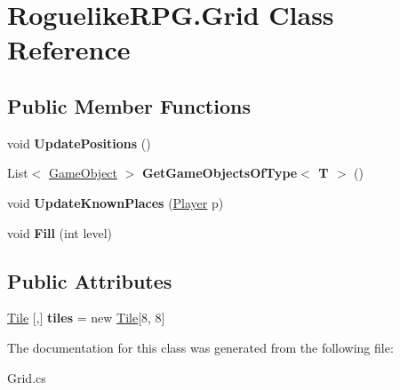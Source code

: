 \hypertarget{class_roguelike_r_p_g_1_1_grid}{}\section{Roguelike\+R\+P\+G.\+Grid Class Reference}
\label{class_roguelike_r_p_g_1_1_grid}
\subsection*{Public Member Functions}
\begin{DoxyCompactItemize}
\item 
\mbox{\label{class_roguelike_r_p_g_1_1_grid_a91be273f5c588230875e727f69956db9}} 
void {\bfseries Update\+Positions} ()
\item 
\mbox{\label{class_roguelike_r_p_g_1_1_grid_aa1811392b11d7f50de49a599128832fe}} 
List$<$ \mbox{\hyperlink{class_roguelike_r_p_g_1_1_game_object}{Game\+Object}} $>$ {\bfseries Get\+Game\+Objects\+Of\+Type$<$ T $>$} ()
\item 
\mbox{\label{class_roguelike_r_p_g_1_1_grid_a025f9368d08af8faf4d3e25765f60aaa}} 
void {\bfseries Update\+Known\+Places} (\mbox{\hyperlink{class_roguelike_r_p_g_1_1_player}{Player}} p)
\item 
\mbox{\label{class_roguelike_r_p_g_1_1_grid_a9997a333c0f023d83b56ca14bd592deb}} 
void {\bfseries Fill} (int level)
\end{DoxyCompactItemize}
\subsection*{Public Attributes}
\begin{DoxyCompactItemize}
\item 
\mbox{\label{class_roguelike_r_p_g_1_1_grid_ae8f1fe9e449ba7110a910631969c4371}} 
\mbox{\hyperlink{class_roguelike_r_p_g_1_1_tile}{Tile}} \mbox{[},\mbox{]} {\bfseries tiles} = new \mbox{\hyperlink{class_roguelike_r_p_g_1_1_tile}{Tile}}\mbox{[}8, 8\mbox{]}
\end{DoxyCompactItemize}


The documentation for this class was generated from the following file\+:\begin{DoxyCompactItemize}
\item 
Grid.\+cs\end{DoxyCompactItemize}

